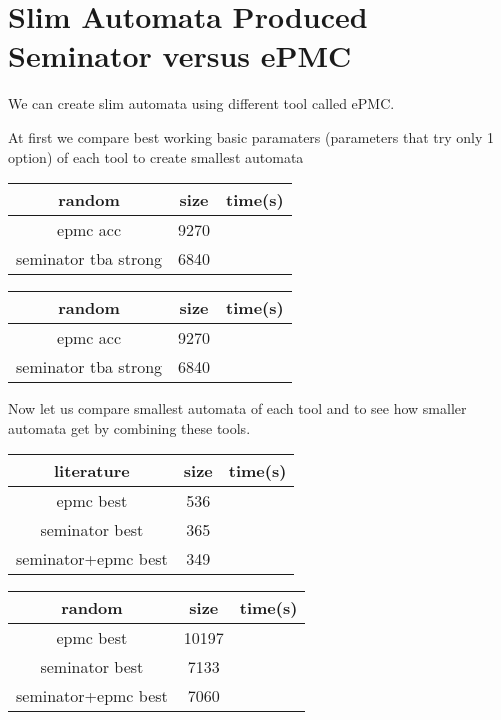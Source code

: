 \documentclass[
	digital
nolof, nolot
]{fithesis3}
\newcommand{\hlineny}{\hline}
\begin{document}
		\section{Slim Automata Produced Seminator versus ePMC}
		We can create slim automata using different tool called ePMC.
		
		At first we compare best working basic paramaters (parameters that try only 1 option) of each tool to create smallest automata
	
	\begin{center}
		\begin{tabular}{ |c|c|c| } 
			\hline
			random&size&time(s)\\
			\hline
			epmc acc&9270 & \\
			\hline
			seminator tba strong &6840 & \\
			\hlineny
		\end{tabular}
	\end{center}
	\begin{center}
		\begin{tabular}{ |c|c|c| } 
			\hline
			random&size&time(s)\\
			\hline
			epmc acc&9270 & \\
			\hline
			seminator tba strong &6840 & \\
			\hlineny
		\end{tabular}
	\end{center}
		Now let us compare smallest automata of each tool and to see how smaller automata get by combining these tools.
		\begin{center}
			\begin{tabular}{ |c|c|c| } 
				\hline
				literature&size&time(s)\\
				\hline
				epmc best&536 & \\
				\hline
				seminator best &365 & \\
				\hlineny
				seminator+epmc best &349 & \\ 
				\hlineny
			\end{tabular}
		\end{center}
	\begin{center}
		\begin{tabular}{ |c|c|c| } 
			\hline
			random&size&time(s)\\
			\hline
			epmc best&10197 & \\
			\hline
			seminator best &7133 & \\
			\hlineny
			seminator+epmc best &7060 & \\ 
			\hlineny
		\end{tabular}
	\end{center}
\end{document}
